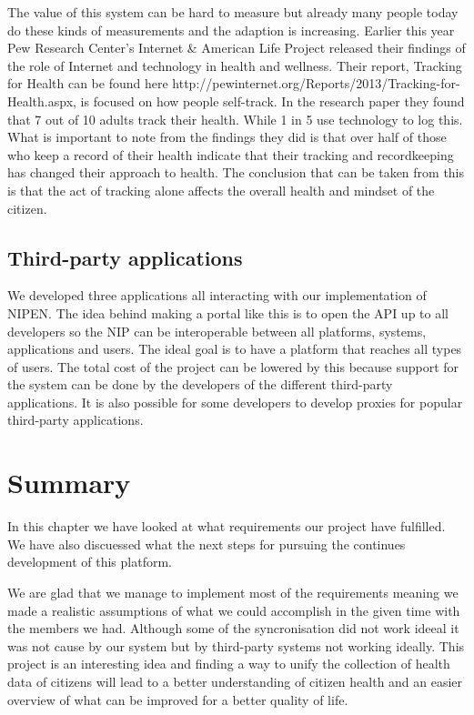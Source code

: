 The value of this system can be hard to measure but already many people today do these kinds of measurements and the adaption is increasing. 
Earlier this year Pew Research Center’s Internet \& American Life Project released their findings of the role of Internet and technology in health and wellness. 
Their report, Tracking for Health can be found here http://pewinternet.org/Reports/2013/Tracking-for-Health.aspx, is focused on how people self-track.
In the research paper they found that 7 out of 10 adults track their health.
While 1 in 5 use technology to log this. 
What is important to note from the findings they did is that over half of those who keep a record of their health indicate that their tracking and recordkeeping has changed their approach to health.
The conclusion that can be taken from this is that the act of tracking alone affects the overall health and mindset of the citizen. 

\fi

\subsection{Third-party applications}

We developed three applications all interacting with our implementation of NIPEN. 
The idea behind making a portal like this is to open the API up to all developers so the NIP can be interoperable between all platforms, systems, applications and users. 
The ideal goal is to have a platform that reaches all types of users. 
The total cost of the project can be lowered by this because support for the system can be done by the developers of the different third-party applications. 
It is also possible for some developers to develop proxies for popular third-party applications.


\section{Summary}
In this chapter we have looked at what requirements our project have fulfilled. 
We have also discuessed what the next steps for pursuing the continues development of this platform. 

We are glad that we manage to implement most of the requirements meaning we made a realistic assumptions of what we could accomplish in the given time with the members we had. 
Although some of the syncronisation did not work ideeal it was not cause by our system but by third-party systems not working ideally. 
This project is an interesting idea and finding a way to unify the collection of health data of citizens will lead to a better understanding of citizen health and an easier overview of what can be improved for a better quality of life. 